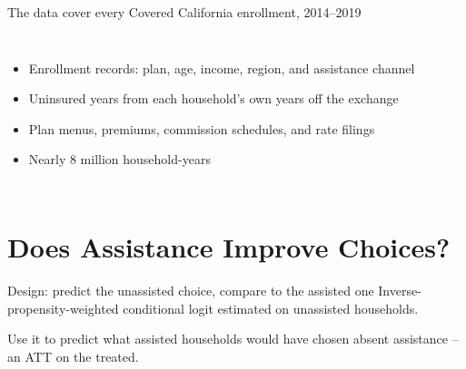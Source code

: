 \documentclass[aspectratio=169,11pt]{beamer}
\begin{document}
\begin{frame}[t]{The data cover every Covered California enrollment, 2014--2019}
  \vspace{0.2cm}
  \begin{columns}[t,onlytextwidth]
      \begin{itemize}
        \item Enrollment records: plan, age, income, region, and assistance channel
        \item Uninsured years from each household's own years off the exchange
        \item Plan menus, premiums, commission schedules, and rate filings
        \item Nearly 8 million household-years
      \end{itemize}
  \end{columns}
\end{frame}

\section{Does Assistance Improve Choices?}
\sectionframe

\begin{frame}{Design: predict the unassisted choice, compare to the assisted one}
  Inverse-propensity-weighted conditional logit estimated on unassisted households.

  \vspace{0.3cm}
  Use it to predict what assisted households would have chosen absent assistance -- an ATT on the treated.
\end{frame}
\end{document}
